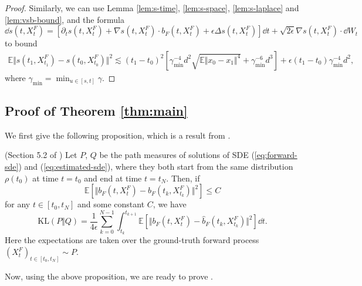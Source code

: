 \begin{proof}
    Similarly, we can use Lemma \ref{lem:s-time}, \ref{lem:s-space}, \ref{lem:s-laplace} and \ref{lem:vsb-bound}, and the formula
    $$\dd s(t,X_t^F)=[\partial_ts(t,X_t^F)+\nabla s(t,X_t^F)\cdot b_F(t,X_t^F)+\epsilon\Delta s(t,X_t^F)]\dd t+\sqrt{2\epsilon}\nabla s(t,X_t^F)\cdot \dd W_t$$
    to bound
    $$\begin{aligned}
        \mathbb{E}\Vert s(t_1,X_{t_1}^F)-s(t_0,X_{t_0}^F)\Vert^2\lesssim(t_1-t_0)^2\left[\gamma_{\min}^{-4}d^2\sqrt{\mathbb{E}\Vert x_0-x_1\Vert^4}+\gamma_{\min}^{-6}d^3\right]+\epsilon(t_1-t_0)\gamma_{\min}^{-4}d^2,
    \end{aligned}$$
    where $\gamma_{\min}=\min_{u\in[s,t]}\gamma$.
\end{proof}

\subsection{Proof of Theorem \ref{thm:main}}
\label{appendix:proofofmain}

We first give the following proposition, which is a result from \cite{chen2023ddpm}.

\begin{proposition}
    (Section 5.2 of \cite{chen2023ddpm}) Let $P$, $Q$ be the path measures of solutions of SDE (\ref{eq:forward-sde}) and (\ref{eq:estimated-sde}), where they both start from the same distribution $\rho(t_0)$ at time $t=t_0$ and end at time $t=t_N$. Then, if
    $$\mathbb{E}[\Vert b_F(t,X_t^F)-\hat{b}_F(t_k,X_{t_k}^F)\Vert^2]\le C$$
    for any $t\in[t_0,t_N]$ and some constant $C$, we have 
    $$\text{KL}(P\Vert Q)=\frac{1}{4\epsilon}\sum_{k=0}^{N-1}\int_{t_k}^{t_{k+1}}\mathbb{E}[\Vert b_F(t,X_t^F)-\hat{b}_F(t_k,X_{t_k}^F)\Vert^2]\dd t.$$
    Here the expectations are taken over the ground-truth forward process $(X_t^F)_{t\in[t_0,t_N]}\sim P$.
    \label{prop:girsanov}
\end{proposition}

Now, using the above proposition, we are ready to prove .

